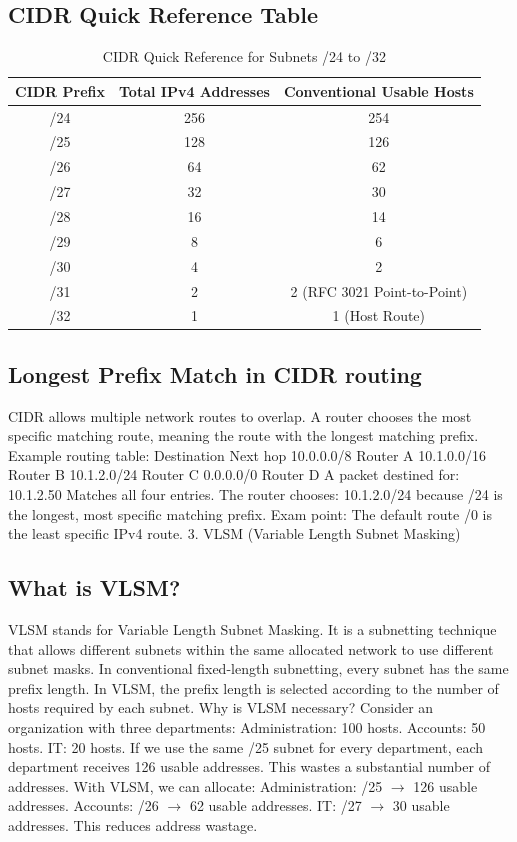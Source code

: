 \subsection{CIDR Quick Reference Table}
\begin{table}[htbp]
\centering
\caption{CIDR Quick Reference for Subnets /24 to /32}
\label{tab:cidr_quick_ref}
\begin{tabular}{ccc}
\toprule
\textbf{CIDR Prefix} & \textbf{Total IPv4 Addresses} & \textbf{Conventional Usable Hosts} \\
\midrule
/24 & 256 & 254 \\
/25 & 128 & 126 \\
/26 & 64  & 62  \\
/27 & 32  & 30  \\
/28 & 16  & 14  \\
/29 & 8   & 6   \\
/30 & 4   & 2   \\
/31 & 2   & 2 (RFC 3021 Point-to-Point) \\
/32 & 1   & 1 (Host Route) \\
\bottomrule
\end{tabular}
\end{table}
\subsection{Longest Prefix Match in CIDR routing}
CIDR allows multiple network routes to overlap.
A router chooses the most specific matching route, meaning the route with the longest matching prefix.
Example routing table:
Destination
Next hop
10.0.0.0/8
Router A
10.1.0.0/16
Router B
10.1.2.0/24
Router C
0.0.0.0/0
Router D
A packet destined for:
10.1.2.50
Matches all four entries.
The router chooses:
10.1.2.0/24
because /24 is the longest, most specific matching prefix.
Exam point: The default route /0 is the least specific IPv4 route.
3. VLSM (Variable Length Subnet Masking)
\subsection{What is VLSM?}
VLSM stands for Variable Length Subnet Masking.
It is a subnetting technique that allows different subnets within the same allocated network to use different subnet masks.
In conventional fixed-length subnetting, every subnet has the same prefix length.
In VLSM, the prefix length is selected according to the number of hosts required by each subnet.
Why is VLSM necessary?
Consider an organization with three departments:
Administration: 100 hosts.
Accounts: 50 hosts.
IT: 20 hosts.
If we use the same /25 subnet for every department, each department receives 126 usable addresses.
This wastes a substantial number of addresses.
With VLSM, we can allocate:
Administration: /25 $\to$ 126 usable addresses.
Accounts: /26 $\to$ 62 usable addresses.
IT: /27 $\to$ 30 usable addresses.
This reduces address wastage.
